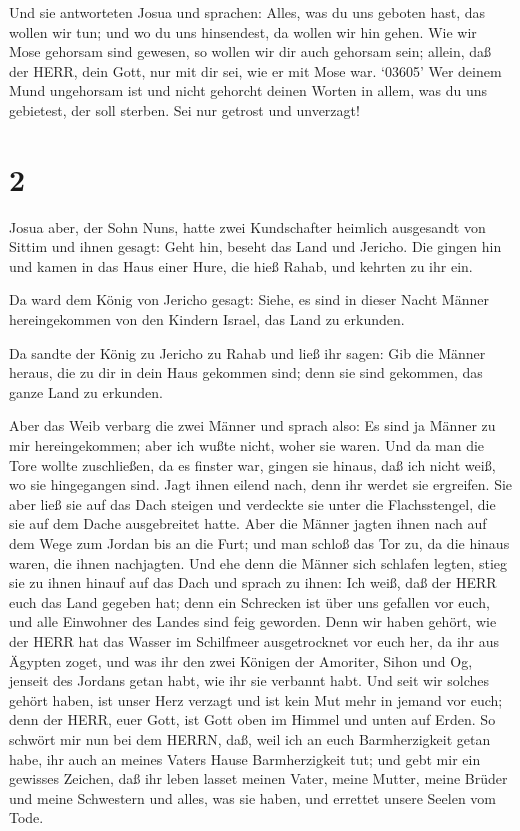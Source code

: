  Und sie antworteten Josua und sprachen: Alles, was du uns
geboten hast, das wollen wir tun; und wo du uns hinsendest, da wollen
wir hin gehen.  Wie wir Mose gehorsam sind gewesen, so
wollen wir dir auch gehorsam sein; allein, daß der HERR, dein Gott, nur
mit dir sei, wie er mit Mose war.  `03605' Wer deinem Mund
ungehorsam ist und nicht gehorcht deinen Worten in allem, was du uns
gebietest, der soll sterben. Sei nur getrost und unverzagt!

\hypertarget{section-1}{%
\section{2}\label{section-1}}

 Josua aber, der Sohn Nuns, hatte zwei Kundschafter heimlich
ausgesandt von Sittim und ihnen gesagt: Geht hin, beseht das Land und
Jericho. Die gingen hin und kamen in das Haus einer Hure, die hieß
Rahab, und kehrten zu ihr ein.

 Da ward dem König von Jericho gesagt: Siehe, es sind in
dieser Nacht Männer hereingekommen von den Kindern Israel, das Land zu
erkunden.

 Da sandte der König zu Jericho zu Rahab und ließ ihr sagen:
Gib die Männer heraus, die zu dir in dein Haus gekommen sind; denn sie
sind gekommen, das ganze Land zu erkunden.

 Aber das Weib verbarg die zwei Männer und sprach also: Es
sind ja Männer zu mir hereingekommen; aber ich wußte nicht, woher sie
waren.  Und da man die Tore wollte zuschließen, da es
finster war, gingen sie hinaus, daß ich nicht weiß, wo sie hingegangen
sind. Jagt ihnen eilend nach, denn ihr werdet sie ergreifen.
 Sie aber ließ sie auf das Dach steigen und verdeckte sie
unter die Flachsstengel, die sie auf dem Dache ausgebreitet hatte.
 Aber die Männer jagten ihnen nach auf dem Wege zum Jordan
bis an die Furt; und man schloß das Tor zu, da die hinaus waren, die
ihnen nachjagten.  Und ehe denn die Männer sich schlafen
legten, stieg sie zu ihnen hinauf auf das Dach  und sprach
zu ihnen: Ich weiß, daß der HERR euch das Land gegeben hat; denn ein
Schrecken ist über uns gefallen vor euch, und alle Einwohner des Landes
sind feig geworden.  Denn wir haben gehört, wie der HERR
hat das Wasser im Schilfmeer ausgetrocknet vor euch her, da ihr aus
Ägypten zoget, und was ihr den zwei Königen der Amoriter, Sihon und Og,
jenseit des Jordans getan habt, wie ihr sie verbannt habt. 
Und seit wir solches gehört haben, ist unser Herz verzagt und ist kein
Mut mehr in jemand vor euch; denn der HERR, euer Gott, ist Gott oben im
Himmel und unten auf Erden.  So schwört mir nun bei dem
HERRN, daß, weil ich an euch Barmherzigkeit getan habe, ihr auch an
meines Vaters Hause Barmherzigkeit tut; und gebt mir ein gewisses
Zeichen,  daß ihr leben lasset meinen Vater, meine Mutter,
meine Brüder und meine Schwestern und alles, was sie haben, und errettet
unsere Seelen vom Tode.

